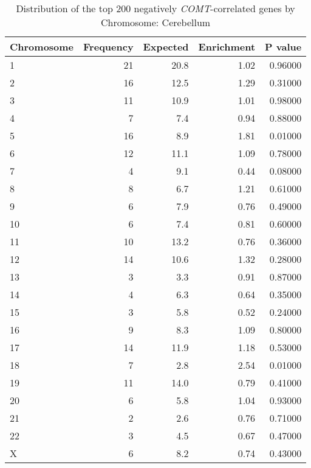 \begin{longtable}{lrrrr}
\caption{Distribution of the top 200 negatively \textit{COMT}-correlated genes by \\ Chromosome: Cerebellum} \\ 
  \toprule
Chromosome & Frequency & Expected & Enrichment & P value \\ 
  \midrule
1 & 21 & 20.8 & 1.02 & 0.96000 \\ 
  2 & 16 & 12.5 & 1.29 & 0.31000 \\ 
  3 & 11 & 10.9 & 1.01 & 0.98000 \\ 
  4 & 7 & 7.4 & 0.94 & 0.88000 \\ 
  5 & 16 & 8.9 & 1.81 & 0.01000 \\ 
  6 & 12 & 11.1 & 1.09 & 0.78000 \\ 
  7 & 4 & 9.1 & 0.44 & 0.08000 \\ 
  8 & 8 & 6.7 & 1.21 & 0.61000 \\ 
  9 & 6 & 7.9 & 0.76 & 0.49000 \\ 
  10 & 6 & 7.4 & 0.81 & 0.60000 \\ 
  11 & 10 & 13.2 & 0.76 & 0.36000 \\ 
  12 & 14 & 10.6 & 1.32 & 0.28000 \\ 
  13 & 3 & 3.3 & 0.91 & 0.87000 \\ 
  14 & 4 & 6.3 & 0.64 & 0.35000 \\ 
  15 & 3 & 5.8 & 0.52 & 0.24000 \\ 
  16 & 9 & 8.3 & 1.09 & 0.80000 \\ 
  17 & 14 & 11.9 & 1.18 & 0.53000 \\ 
  18 & 7 & 2.8 & 2.54 & 0.01000 \\ 
  19 & 11 & 14.0 & 0.79 & 0.41000 \\ 
  20 & 6 & 5.8 & 1.04 & 0.93000 \\ 
  21 & 2 & 2.6 & 0.76 & 0.71000 \\ 
  22 & 3 & 4.5 & 0.67 & 0.47000 \\ 
  X & 6 & 8.2 & 0.74 & 0.43000 \\ 
   \bottomrule
\end{longtable}
